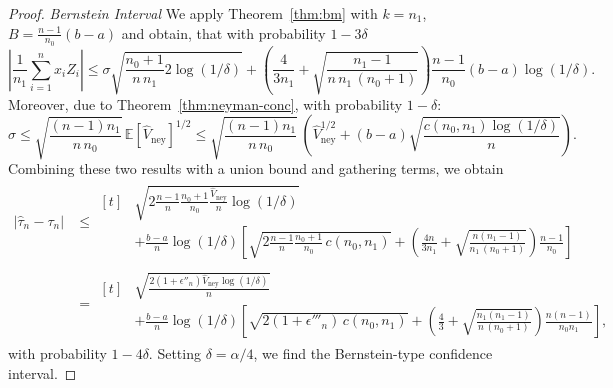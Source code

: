 \documentclass[aos]{imsart2}
\theoremstyle{plain}
\theoremstyle{definition}
\newcommand{\E}{\mathbb{E}}
\newcommand{\vhn}{\hat{V}_{\mathrm{ney}}}
\newcommand{\tauh}{\hat{\tau}}
\begin{document}
\begin{appendix}
\begin{proof}
    \textit{Bernstein Interval} We apply Theorem~\ref{thm:bm} with $k=n_1$, $B=\frac{n-1}{n_0}(b-a)$ and obtain, that with probability $1-3\delta$
    \begin{equation*}
        \left\vert\frac{1}{n_1}\sum_{i=1}^n x_i Z_i\right\vert \leq \sigma \sqrt{\frac{n_0+1}{n\,n_1}2\log(1/\delta)}+\left(\frac{4}{3n_1} + \sqrt{\frac{n_1-1}{n\,n_1\,(n_0+1)}}\right) \frac{n-1}{n_0}(b-a)\log(1/\delta).
    \end{equation*}
    Moreover, due to Theorem~\ref{thm:neyman-conc}, with probability $1-\delta$:
    \begin{equation*}
        \sigma \leq \sqrt{\frac{(n-1)n_1}{n\,n_0}}\, \E[\vhn]^{1/2} \leq \sqrt{\frac{(n-1)n_1}{n\,n_0}}\, \left(\vhn^{1/2} +(b-a) \sqrt{\frac{c(n_0,n_1)\log(1/\delta)}{n}}\right).
    \end{equation*}
    Combining these two results with a union bound and gathering terms, we obtain
    \begin{align*}
        \left\vert\tauh_n - \tau_n\right\vert &\leq
        \begin{aligned}[t]
        &\sqrt{2\frac{n-1}{n}\frac{n_0+1}{n_0} \frac{\vhn}{n}\log(1/\delta)}\\
        &+ \frac{b-a}{n}\log(1/\delta)\left[\sqrt{2\frac{n-1}{n}\frac{n_0+1}{n_0}\,c(n_0,n_1)} + \left(\frac{4n}{3n_1} + \sqrt{\frac{n(n_1-1)}{n_1\,(n_0+1)}}\right) \frac{n-1}{n_0}\right]
        \end{aligned}\\
        &=\begin{aligned}[t]
        &\sqrt{\frac{2(1+\epsilon''_n) \vhn\log(1/\delta)}{n}}\\
        &+
        \frac{b-a}{n}\log(1/\delta)\left[\sqrt{2(1+\epsilon'''_n)\,c(n_0,n_1)} + \left(\frac{4}{3} + \sqrt{\frac{n_1(n_1-1)}{n\,(n_0+1)}}\right) \frac{n(n-1)}{n_0n_1}\right],
        \end{aligned}
    \end{align*}
    with probability $1-4\delta$. Setting $\delta = \alpha/4$, we find the Bernstein-type confidence interval.
    


\end{proof}
\end{appendix}
\end{document}
